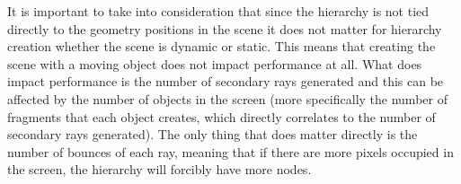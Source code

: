 \medskip

It is important to take into consideration that since the hierarchy is not tied directly to the geometry positions in the scene it does not matter for hierarchy creation whether the scene is dynamic or static. This means that creating the scene with a moving object does not impact performance at all. What does impact performance is the number of secondary rays generated and this can be affected by the number of objects in the screen (more specifically the number of fragments that each object creates, which directly correlates to the number of secondary rays generated). The only thing that does matter directly is the number of bounces of each ray, meaning that if there are more pixels occupied in the screen, the hierarchy will forcibly have more nodes.

\medskip

